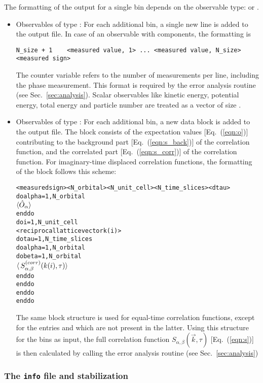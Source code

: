 The formatting of the output for a single bin depends on the observable type:  or .
\begin{itemize}
\item Observables of type :
For each additional bin, a single new line is added to the output file.
In case of an observable with  components, the formatting is 
\begin{verbatim}
N_size + 1    <measured value, 1> ... <measured value, N_size>    <measured sign>
\end{verbatim}
The counter variable  refers to the number of measurements per line, including the phase measurement. 
This format is required by the error analysis routine (see Sec.~\ref{sec:analysis}). 
Scalar observables like kinetic energy, potential energy, total energy and particle number are treated as a vector 
of size .

\item Observables of type :
For each additional bin, a new data block is added to the output file. 
The block consists of the expectation values [Eq.~(\ref{eqn:o})] contributing to the background part [Eq.~(\ref{eqn:s_back})] of the correlation function,
and the correlated part [Eq.~(\ref{eqn:s_corr})] of the correlation function.
For imaginary-time displaced correlation functions, the formatting of the block follows this scheme:
\begin{alltt}
<measured sign>  <N_orbital>  <N_unit_cell> <N_time_slices> <dtau>
do alpha = 1, N_orbital
    \(\langle\hat{O}\sb{\alpha}\rangle \)
enddo
do i = 1, N_unit_cell
   <reciprocal lattice vector k(i)>
   do tau = 1, N_time_slices
      do alpha = 1, N_orbital
         do beta = 1, N_orbital
            \(\langle\,S\sb{\alpha,\beta}\sp{(corr)}(k(i),\tau)\rangle\)
         enddo
      enddo
   enddo
enddo
\end{alltt}
The same block structure is used for equal-time correlation functions, except for the entries   and  
which are not present in the latter.
Using this structure for the bins as input,
the full correlation function $S_{\alpha,\beta}(\vec{k},\tau)$ [Eq.~(\ref{eqn:s})] is then calculated by calling the error analysis routine (see Sec.~\ref{sec:analysis})
\end{itemize}

\subsubsection{The \texttt{info}  file and stabilization}


